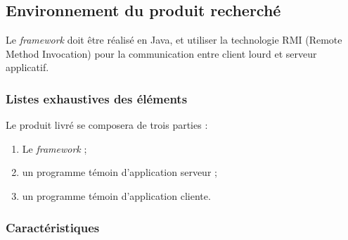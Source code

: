 \subsection{Environnement du produit recherché}

Le \textit{framework} doit être réalisé en Java, et utiliser la technologie RMI (Remote Method Invocation) pour la communication entre client lourd et serveur applicatif.

\subsubsection{Listes exhaustives des éléments}

Le produit livré se composera de trois parties :
\begin{enumerate}
 \item Le \textit{framework} ;
 \item un programme témoin d'application serveur ;
 \item un programme témoin d'application cliente.
\end{enumerate}

\subsubsection{Caractéristiques}

